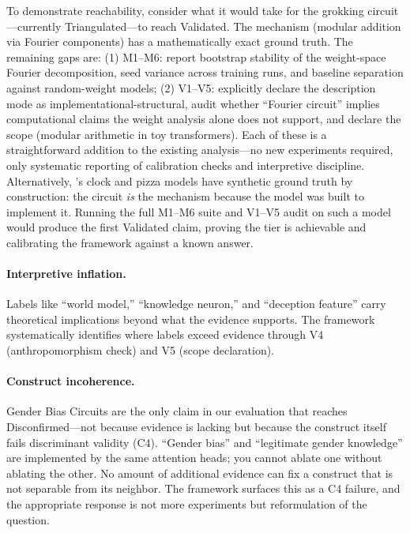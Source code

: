 \documentclass{article}
\begin{document}
To demonstrate reachability, consider what it would take for the grokking circuit---currently Triangulated---to reach Validated. The mechanism (modular addition via Fourier components) has a mathematically exact ground truth. The remaining gaps are: (1) M1--M6: report bootstrap stability of the weight-space Fourier decomposition, seed variance across training runs, and baseline separation against random-weight models; (2) V1--V5: explicitly declare the description mode as implementational-structural, audit whether ``Fourier circuit'' implies computational claims the weight analysis alone does not support, and declare the scope (modular arithmetic in toy transformers). Each of these is a straightforward addition to the existing analysis---no new experiments required, only systematic reporting of calibration checks and interpretive discipline. Alternatively, \citet{nanda2023progress}'s clock and pizza models have synthetic ground truth by construction: the circuit \emph{is} the mechanism because the model was built to implement it. Running the full M1--M6 suite and V1--V5 audit on such a model would produce the first Validated claim, proving the tier is achievable and calibrating the framework against a known answer.

\paragraph{Interpretive inflation.} Labels like ``world model,'' ``knowledge neuron,'' and ``deception feature'' carry theoretical implications beyond what the evidence supports. The framework systematically identifies where labels exceed evidence through V4 (anthropomorphism check) and V5 (scope declaration).

\paragraph{Construct incoherence.} Gender Bias Circuits are the only claim in our evaluation that reaches Disconfirmed---not because evidence is lacking but because the construct itself fails discriminant validity (C4). ``Gender bias'' and ``legitimate gender knowledge'' are implemented by the same attention heads; you cannot ablate one without ablating the other. No amount of additional evidence can fix a construct that is not separable from its neighbor. The framework surfaces this as a C4 failure, and the appropriate response is not more experiments but reformulation of the question.

\end{document}
